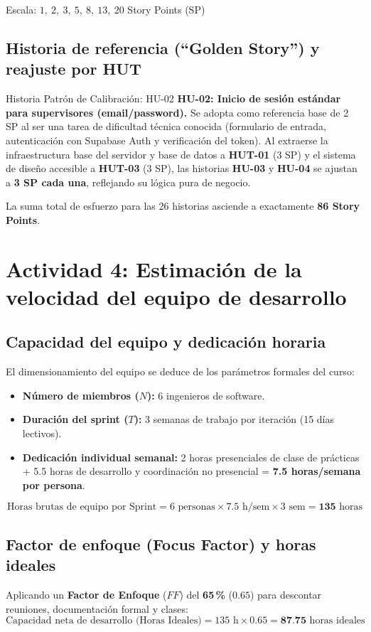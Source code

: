 \documentclass[11pt,a4paper]{article}
\newcommand{\hl}[1]{\textcolor{gblue}{\textbf{#1}}}
\begin{document}
\begin{center}Escala: $1,\ 2,\ 3,\ 5,\ 8,\ 13,\ 20$ Story Points (SP)\end{center}

\subsection{Historia de referencia (``Golden Story'') y reajuste por HUT}
\begin{verde}{Historia Patrón de Calibración: HU-02}
\textbf{HU-02: Inicio de sesión estándar para supervisores (email/password).} Se adopta como referencia base de 2 SP al ser una tarea de dificultad técnica conocida (formulario de entrada, autenticación con Supabase Auth y verificación del token). Al extraerse la infraestructura base del servidor y base de datos a \textbf{HUT-01} (3 SP) y el sistema de diseño accesible a \textbf{HUT-03} (3 SP), las historias \textbf{HU-03} y \textbf{HU-04} se ajustan a \textbf{3 SP cada una}, reflejando su lógica pura de negocio.
\end{verde}
La suma total de esfuerzo para las 26 historias asciende a exactamente \hl{86 Story Points}.

\section{Actividad 4: Estimación de la velocidad del equipo de desarrollo}
\subsection{Capacidad del equipo y dedicación horaria}
El dimensionamiento del equipo se deduce de los parámetros formales del curso:

\begin{itemize}
\item \textbf{Número de miembros ($N$):} 6 ingenieros de software.
\item \textbf{Duración del sprint ($T$):} 3 semanas de trabajo por iteración (15 días lectivos).
\item \textbf{Dedicación individual semanal:} 2 horas presenciales de clase de prácticas + 5.5 horas de desarrollo y coordinación no presencial = \textbf{7.5 horas/semana por persona}.
\end{itemize}
\[\text{Horas brutas de equipo por Sprint} = 6 \text{ personas} \times 7.5 \text{ h/sem} \times 3 \text{ sem} = \textbf{135}\text{ horas}\]

\subsection{Factor de enfoque (Focus Factor) y horas ideales}
Aplicando un \textbf{Factor de Enfoque} ($FF$) del \hl{65\,\%} ($0.65$) para descontar reuniones, documentación formal y clases:
\[\text{Capacidad neta de desarrollo (Horas Ideales)} = 135 \text{ h} \times 0.65 = \textbf{87.75}\text{ horas ideales}\]
\end{document}
